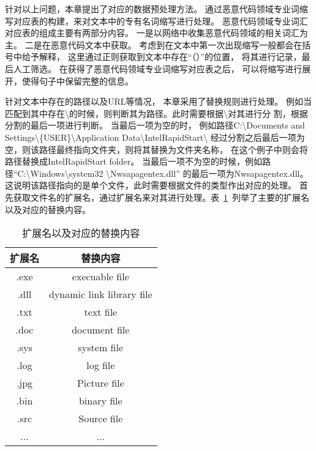 针对以上问题，本章提出了对应的数据预处理方法。
通过恶意代码领域专业词缩写对应表的构建，来对文本中的专有名词缩写进行处理。
恶意代码领域专业词汇对应表的组成主要有两部分内容。
一是以网络中收集恶意代码领域的相关词汇为主。
二是在恶意代码文本中获取。
考虑到在文本中第一次出现缩写一般都会在括号中给予解释，
这里通过正则获取到文本中存在“（）”的位置，
将其进行记录，最后人工筛选。
在获得了恶意代码领域专业词缩写对应表之后，
可以将缩写进行展开，使得句子中保留完整的信息。

针对文本中存在的路径以及URL等情况，
本章采用了替换规则进行处理。
例如当匹配到其中存在\textbackslash 的时候，则判断其为路径。此时需要根据\textbackslash 对其进行分
割，根据分割的最后一项进行判断。
当最后一项为空的时，
例如路径C:\textbackslash Documents and Settings\textbackslash \{USER\}\textbackslash Application Data\textbackslash IntelRapidStart\textbackslash
经过分割之后最后一项为空，则该路径最终指向文件夹，则将其替换为文件夹名称，
在这个例子中则会将路径替换成IntelRapidStart folder。
当最后一项不为空的时候，例如路径“C:\textbackslash Windows\textbackslash system32 \textbackslash Nwsapagentex.dll”
的最后一项为Nwsapagentex.dll。
这说明该路径指向的是单个文件，此时需要根据文件的类型作出对应的处理。
首先获取文件名的扩展名，通过扩展名来对其进行处理。表~\ref{tab:extractname}~列举了主要的扩展名以及对应的替换内容。

\begin{table}[htb]
	\renewcommand{\arraystretch}{1.3}
	\caption{扩展名以及对应的替换内容}
	\label{tab:extractname}
	\vspace{0.5em}\centering\wuhao
	\begin{tabular}{c c}
		\toprule 扩展名 & 替换内容  \\
		\midrule[1pt] 
		.exe & execuable file \\
		.dll & dynamic link library file \\
		.txt & text file \\ 
		.doc & document file \\
		.sys & system file \\
		.log & log file \\
		.jpg & Picture file \\
		.bin & binary file \\
		.src & Source file \\ 
		... & ... \\
		 \bottomrule[1.5pt] 
	\end{tabular}
\end{table}

